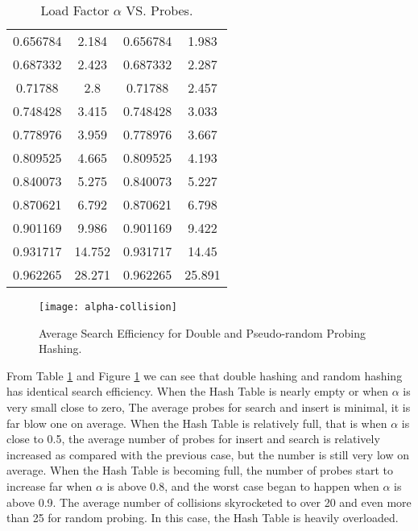 \documentclass{article}
\begin{document}
\begin{itemize}
\begin{table}[H]
\begin{center}
\begin{tabular}{c|c|c|c}
      0.656784 & 2.184 & 0.656784 & 1.983 \\
      0.687332 & 2.423 & 0.687332 & 2.287 \\
      0.71788 & 2.8 & 0.71788 & 2.457 \\
      0.748428 & 3.415 & 0.748428 & 3.033 \\
      0.778976 & 3.959 & 0.778976 & 3.667 \\
      0.809525 & 4.665 & 0.809525 & 4.193 \\
      0.840073 & 5.275 & 0.840073 & 5.227 \\
      0.870621 & 6.792 & 0.870621 & 6.798 \\
      0.901169 & 9.986 & 0.901169 & 9.422 \\
      0.931717 & 14.752 & 0.931717 & 14.45 \\
      0.962265 & 28.271 & 0.962265 & 25.891 \\
      \hline
    \end{tabular}
    \caption{Load Factor $\alpha$ VS. Probes.\label{tbl:effi}} 
    \vspace{-15pt}
  \end{center}
\end{table}

\begin{figure}[H]
\vspace{-15pt}
  \begin{center}
    \texttt{[image: alpha-collision]}
    \caption{Average Search Efficiency for Double and Pseudo-random
      Probing Hashing.\label{fig:effi}}
  \end{center}
\vspace{-10pt}
\end {figure}

From Table \ref{tbl:effi} and Figure \ref{fig:effi} we can see that
double hashing and random hashing has identical search
efficiency. When the Hash Table is nearly empty or when $\alpha$ is
very small close to zero, The average probes for search and insert is
minimal, it is far blow one on average. When the Hash Table is
relatively full, that is when $\alpha$ is close to 0.5, the average
number of probes for insert and search is relatively increased as
compared with the previous case, but the number is still very low on
average. When the Hash Table is becoming full, the number of probes
start to increase far when $\alpha$ is above 0.8, and the worst case
began to happen when $\alpha$ is above 0.9. The average number of
collisions skyrocketed to over 20 and even more than 25 for random
probing. In this case, the Hash Table is heavily overloaded.


\end{itemize}
\end{document}
